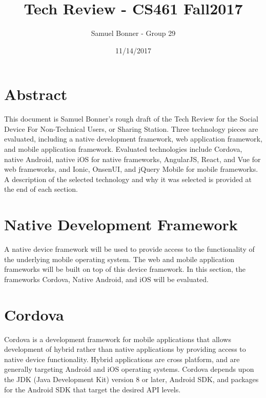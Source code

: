 \documentclass[letterpaper,10pt,draftclsnofoot,onecolumn]{IEEEtran}
\begin{document}
\title{Tech Review - CS461 \newline Fall2017}
\author{Samuel Bonner - Group 29}
\date{11/14/2017}
\maketitle

\section{Abstract}
This document is Samuel Bonner's rough draft of the Tech Review for the Social Device For Non-Technical Users, or Sharing Station. Three technology pieces are evaluated, including a native development framework, web application framework, and mobile application framework. Evaluated technologies include Cordova, native Android, native iOS for native frameworks, AngularJS, React, and Vue for web frameworks, and Ionic, OnsenUI, and jQuery Mobile for mobile frameworks. A description of the selected technology and why it was selected is provided at the end of each section.
\pagebreak
\section*{Native Development Framework}
A native device framework will be used to provide access to the functionality of the underlying mobile operating system. The web and mobile application frameworks will be built on top of this device framework. In this section, the frameworks Cordova, Native Android, and iOS will be evaluated.
\section*{Cordova}
Cordova is a development framework for mobile applications that allows development of hybrid rather than native applications by providing access to native device functionality. Hybrid applications are cross platform, and are generally targeting Android and iOS operating systems. Cordova depends upon the JDK (Java Development Kit) version 8 or later, Android SDK, and packages for the Android SDK that target the desired API levels.
\end{document}
